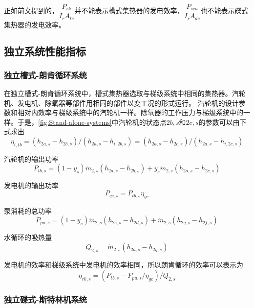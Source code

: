 正如前文提到的，$\dfrac{P_{rk}}{I_rA_{tc}}$并不能表示槽式集热器的发电效率，$\dfrac{P_{sea}}{I_rA_{dc}}$也不能表示碟式集热器的发电效率。

\subsection{独立系统性能指标}

\subsubsection{独立槽式-朗肯循环系统}

在独立槽式-朗肯循环系统中，槽式集热器选取与梯级系统中相同的集热器。汽轮机、发电机、除氧器等部件用相同的部件以变工况的形式运行。
汽轮机的设计参数和相对内效率与梯级系统中的汽轮机一样。除氧器的工作压力与梯级系统中的一样。于是，\autoref{fig:Stand-alone-systems}中汽轮机的状态点$2b,s$和$2c,s$的参数可以由下式求出
\begin{equation}
	\eta_{i,tb}= (h_{2a,s}-h_{2b,s})/(h_{2a,s}-h_{i,2b,s}) = (h_{2a,s}-h_{2c,s})/(h_{2a,s}-h_{i,2c,s})
\end{equation}

汽轮机的输出功率
\begin{equation}
	P_{tb,s}=\left(1-y_{s}\right)\dot{m}_{2,s}\left(h_{2a,s}-h_{2b,s}\right)+y_{s}\dot{m}_{2,s}\left(h_{2a,s}-h_{2c,s}\right)
\end{equation}

发电机的输出功率
\begin{equation}
	P_{ge,s}=P_{tb,s}\eta_{ge}
\end{equation}

泵消耗的总功率
\begin{equation}
	P_{pu,s}=\left(1-y_{s}\right)\dot{m}_{2,s}\left(h_{2e,s}-h_{2d,s}\right)+\dot{m}_{2,s}\left(h_{2g,s}-h_{2f,s}\right)
\end{equation}

水循环的吸热量
\begin{equation}
	Q_{2,s}=\dot{m}_{2,s}\left(h_{2a,s}-h_{2g,s}\right)
\end{equation}

发电机的效率和梯级系统中发电机的效率相同，所以朗肯循环的效率可以表示为
\begin{equation}
	\eta_{rk,s}=(P_{tb,s}-P_{pu,s}/\eta_{ge})/Q_{2,s}
\end{equation}

\subsubsection{独立碟式-斯特林机系统}

